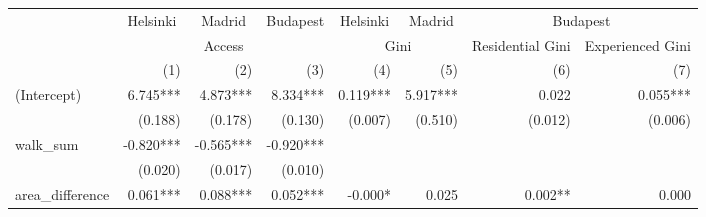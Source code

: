\begin{tabular}{lrrrrrrr}
\toprule
                      & \multicolumn{1}{c}{Helsinki} & \multicolumn{1}{c}{Madrid} & \multicolumn{1}{c}{Budapest} & \multicolumn{1}{c}{Helsinki} & \multicolumn{1}{c}{Madrid} &                         \multicolumn{2}{c}{Budapest}                        \\ 
\cmidrule(lr){2-2} \cmidrule(lr){3-3} \cmidrule(lr){4-4} \cmidrule(lr){5-5} \cmidrule(lr){6-6} \cmidrule(lr){7-8} 
                      &                                \multicolumn{3}{c}{Access}                                &                  \multicolumn{2}{c}{Gini}                 & \multicolumn{1}{c}{Residential Gini} & \multicolumn{1}{c}{Experienced Gini} \\ 
\cmidrule(lr){2-4} \cmidrule(lr){5-6} \cmidrule(lr){7-7} \cmidrule(lr){8-8} 
                      &                          (1) &                        (2) &                          (3) &                          (4) &                        (5) &                                  (6) &                                  (7) \\ 
\midrule
(Intercept)           &                     6.745*** &                   4.873*** &                     8.334*** &                     0.119*** &                   5.917*** &                                0.022 &                             0.055*** \\ 
                      &                      (0.188) &                    (0.178) &                      (0.130) &                      (0.007) &                    (0.510) &                              (0.012) &                              (0.006) \\ 
walk\_sum             &                    -0.820*** &                  -0.565*** &                    -0.920*** &                              &                            &                                      &                                      \\ 
                      &                      (0.020) &                    (0.017) &                      (0.010) &                              &                            &                                      &                                      \\ 
area\_difference      &                     0.061*** &                   0.088*** &                     0.052*** &                      -0.000* &                      0.025 &                              0.002** &                                0.000 \\ 

\end{tabular}
